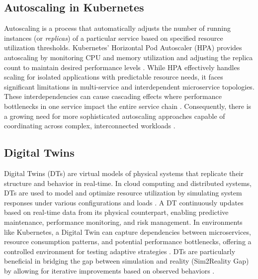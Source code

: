 \documentclass[conference]{IEEEtran}
\begin{document}
\subsection{Autoscaling in Kubernetes}
Autoscaling is a process that automatically adjusts the number of running instances (or \textit{replicas}) of a particular service based on specified resource utilization thresholds. Kubernetes' Horizontal Pod Autoscaler (HPA) provides autoscaling by monitoring CPU and memory utilization and adjusting the replica count to maintain desired performance levels \cite{hpa_design}. While HPA effectively handles scaling for isolated applications with predictable resource needs, it faces significant limitations in multi-service and interdependent microservice topologies. These interdependencies can cause cascading effects where performance bottlenecks in one service impact the entire service chain \cite{park_predictive_scaling}. Consequently, there is a growing need for more sophisticated autoscaling approaches capable of coordinating across complex, interconnected workloads \cite{liu_dt_cloud}.

\subsection{Digital Twins}
Digital Twins (DTs) are virtual models of physical systems that replicate their structure and behavior in real-time. In cloud computing and distributed systems, DTs are used to model and optimize resource utilization by simulating system responses under various configurations and loads \cite{schleich_digital_twin}. A DT continuously updates based on real-time data from its physical counterpart, enabling predictive maintenance, performance monitoring, and risk management. In environments like Kubernetes, a Digital Twin can capture dependencies between microservices, resource consumption patterns, and potential performance bottlenecks, offering a controlled environment for testing adaptive strategies \cite{zhang_marl_k8s}. DTs are particularly beneficial in bridging the gap between simulation and reality (Sim2Reality Gap) by allowing for iterative improvements based on observed behaviors \cite{nguyen_sim2reality}.
\end{document}

